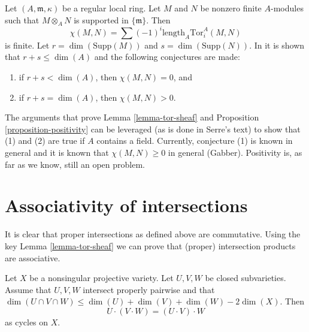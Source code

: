 \begin{remark}
\label{remark-Serre-conjectures}
Let $(A, \mathfrak m, \kappa)$ be a regular local ring.
Let $M$ and $N$ be nonzero finite $A$-modules such that $M \otimes_A N$
is supported in $\{\mathfrak m\}$. Then
$$
\chi(M, N) = \sum (-1)^i \text{length}_A \text{Tor}_i^A(M, N)
$$
is finite. Let $r = \dim(\text{Supp}(M))$ and $s = \dim(\text{Supp}(N))$.
In \cite{Serre_algebre_locale} it is shown that $r + s \leq \dim(A)$
and the following conjectures are made:
\begin{enumerate}
\item if $r + s < \dim(A)$, then $\chi(M, N) = 0$, and
\item if $r + s = \dim(A)$, then $\chi(M, N) > 0$.
\end{enumerate}
The arguments that prove Lemma \ref{lemma-tor-sheaf} and
Proposition \ref{proposition-positivity} can be leveraged
(as is done in Serre's text) to show that (1) and (2) are
true if $A$ contains a field. Currently, conjecture (1) is known
in general and it is known that $\chi(M, N) \geq 0$ in general (Gabber).
Positivity is, as far as we know, still an open problem.
\end{remark}



\section{Associativity of intersections}
\label{section-associative}

\noindent
It is clear that proper intersections as defined above are commutative.
Using the key Lemma \ref{lemma-tor-sheaf} we can prove that (proper)
intersection products are associative.

\begin{lemma}
\label{lemma-associative}
Let $X$ be a nonsingular projective variety. Let $U, V, W$ be closed
subvarieties. Assume that $U, V, W$ intersect properly pairwise
and that $\dim(U \cap V \cap W) \leq \dim(U) + \dim(V) + \dim(W) - 2\dim(X)$.
Then
$$
U \cdot (V \cdot W) = (U \cdot V) \cdot W
$$
as cycles on $X$.
\end{lemma}

